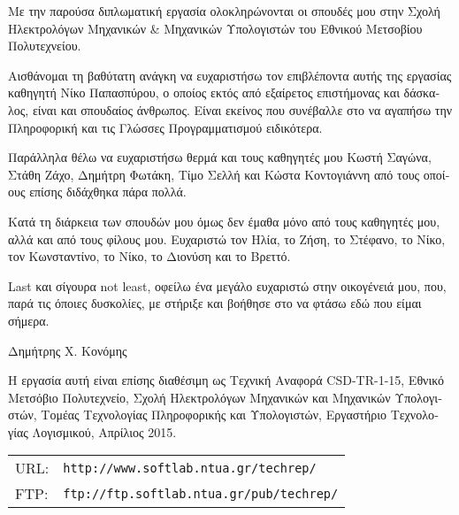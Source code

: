 \begin{greek}
\begin{acknowledgements}
Με την παρούσα διπλωματική εργασία ολοκληρώνονται οι σπουδές μου στην Σχολή 
Ηλεκτρολόγων Μηχανικών \& Μηχανικών Υπολογιστών του Εθνικού Μετσοβίου 
Πολυτεχνείου.

Αισθάνομαι τη βαθύτατη ανάγκη να ευχαριστήσω τον επιβλέποντα αυτής της εργασίας 
καθηγητή Νίκο Παπασπύρου, ο οποίος εκτός από εξαίρετος επιστήμονας και δάσκαλος, 
είναι και σπουδαίος άνθρωπος. Είναι εκείνος που συνέβαλλε στο να αγαπήσω την 
Πληροφορική και τις Γλώσσες Προγραμματισμού ειδικότερα. 

Παράλληλα θέλω να ευχαριστήσω θερμά και τους καθηγητές μου Κωστή Σαγώνα, 
Στάθη Ζάχο, Δημήτρη Φωτάκη, Τίμο Σελλή και Κώστα Κοντογιάννη από τους οποίους επίσης διδάχθηκα 
πάρα πολλά.

Κατά τη διάρκεια των σπουδών μου όμως δεν έμαθα μόνο από τους καθηγητές μου, αλλά 
και από τους φίλους μου. Ευχαριστώ τον Ηλία, το Ζήση, το Στέφανο, το Νίκο, 
τον Κωνσταντίνο, το Νίκο, το Διονύση και το Βρεττό.

Last και σίγουρα not least, οφείλω ένα μεγάλο ευχαριστώ στην οικογένειά μου, που, 
παρά τις όποιες δυσκολίες, με στήριξε και βοήθησε στο να φτάσω εδώ που 
είμαι σήμερα.
\begin{flushright}Δημήτρης X. Κονόμης\end{flushright}

\vfill

    Η εργασία αυτή είναι επίσης διαθέσιμη ως Τεχνική Αναφορά
    CSD-TR-1-15, Εθνικό Μετσόβιο Πολυτεχνείο, Σχολή Ηλεκτρολόγων
    Μηχανικών και Μηχανικών Υπολογιστών, Τομέας Τεχνολογίας
    Πληροφορικής και Υπολογιστών, Εργαστήριο Τεχνολογίας
    Λογισμικού, Απρίλιος 2015.
    \\[6pt]
    \begin{tabular}{@{}ll@{}}
    URL: & \texttt{http://www.softlab.ntua.gr/techrep/} \\
    FTP: & \texttt{ftp://ftp.softlab.ntua.gr/pub/techrep/}
    \end{tabular}

\end{acknowledgements}
\end{greek}
